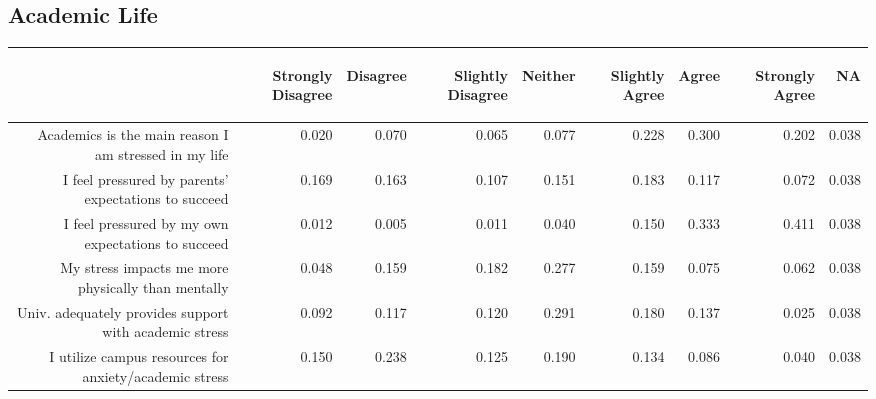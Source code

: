 \documentclass{article}\usepackage[]{graphicx}\usepackage[]{color}
\begin{document}
\subsection{Academic Life}
\begin{table}[ht]
\centering
\begin{tabular}{rrrrrrrrr}
  \hline
 & \begin{sideways} Strongly Disagree \end{sideways} & \begin{sideways} Disagree \end{sideways} & \begin{sideways} Slightly Disagree \end{sideways} & \begin{sideways} Neither \end{sideways} & \begin{sideways} Slightly Agree \end{sideways} & \begin{sideways} Agree \end{sideways} & \begin{sideways} Strongly Agree \end{sideways} & \begin{sideways} NA \end{sideways} \\ 
  \hline
Academics is the main reason I am stressed in my life & 0.020 & 0.070 & 0.065 & 0.077 & 0.228 & 0.300 & 0.202 & 0.038 \\ 
  I feel pressured by parents' expectations to succeed & 0.169 & 0.163 & 0.107 & 0.151 & 0.183 & 0.117 & 0.072 & 0.038 \\ 
  I feel pressured by my own expectations to succeed & 0.012 & 0.005 & 0.011 & 0.040 & 0.150 & 0.333 & 0.411 & 0.038 \\ 
  My stress impacts me more physically than mentally & 0.048 & 0.159 & 0.182 & 0.277 & 0.159 & 0.075 & 0.062 & 0.038 \\ 
  Univ. adequately provides support with academic stress & 0.092 & 0.117 & 0.120 & 0.291 & 0.180 & 0.137 & 0.025 & 0.038 \\ 
  I utilize campus resources for anxiety/academic stress & 0.150 & 0.238 & 0.125 & 0.190 & 0.134 & 0.086 & 0.040 & 0.038 \\ 
   \hline
\end{tabular}
\end{table}
\end{document}
